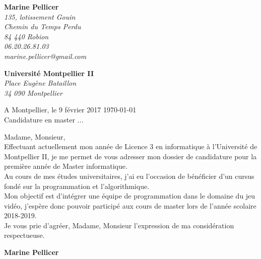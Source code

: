 \documentclass[11pt]{letter}
\begin{document}
 \sffamily
 \hfill
 \begin{flushleft}
 {\bfseries Marine Pellicer}\\[.35ex]
 \small\itshape
 135, lotissement Gouin \\
 Chemin du Temps Perdu\\
 84 440 Robion\\[.35ex]
 06.20.26.81.03\\
 marine.pellicer@gmail.com
 \end{flushleft}
 \begin{flushright}
 {\bfseries Université Montpellier II}\\[.35ex]
 \small\itshape
 Place Eugène Bataillon\\
 34 090 Montpellier
 \end{flushright}
 \hfill
 \begin{flushright}
 A Montpellier, le 9 février 2017 \today \\
 Candidature en master ...
 \end{flushright}
 Madame, Monsieur,\\
 Effectuant actuellement mon année de Licence 3 en informatique à l'Université de Montpellier II, je me permet de vous adresser mon dossier de candidature pour la première année de Master informatique.\\
 Au cours de mes études universitaires, j'ai eu l'occasion de bénéficier d'un cursus fondé sur la programmation et l'algorithmique.\\
 Mon objectif est d'intégrer une équipe de programmation dans le domaine du jeu vidéo, j'espère donc pouvoir participé aux cours de master lors de l'année scolaire 2018-2019.\\
Je vous prie d'agréer, Madame, Monsieur l'expression de ma considération respectueuse.\\
 \begin{center}
 {\bfseries Marine Pellicer}\\
 \end{center}
 \vfill
 
\end{document}
